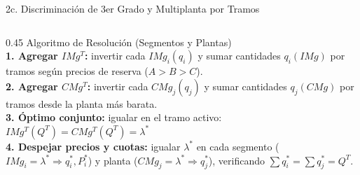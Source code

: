 \documentclass[aspectratio=169, 10pt]{beamer}
\begin{document}
\begin{frame}{2c. Discriminación de 3er Grado y Multiplanta por Tramos}
\begin{columns}[T]
    \begin{column}{0.45\textwidth}
      {\scriptsize\color{grisTexto}Algoritmo de Resolución (Segmentos y Plantas)}\\[2pt]
      {\scriptsize
        \textbf{1. Agregar \(IMg^T\):} invertir cada \(IMg_i(q_i)\) y sumar cantidades \(q_i(IMg)\) por tramos según precios de reserva (\(A > B > C\)).\\[2pt]
        \textbf{2. Agregar \(CMg^T\):} invertir cada \(CMg_j(q_j)\) y sumar cantidades \(q_j(CMg)\) por tramos desde la planta más barata.\\[2pt]
        \textbf{3. Óptimo conjunto:} igualar en el tramo activo:\\
        \quad \(\displaystyle IMg^T(Q^T) = CMg^T(Q^T) = \lambda^*\)\\[2pt]
        \textbf{4. Despejar precios y cuotas:} igualar \(\lambda^*\) en cada segmento (\(IMg_i = \lambda^* \Rightarrow q_i^*, P_i^*\)) y planta (\(CMg_j = \lambda^* \Rightarrow q_j^*\)), verificando \(\sum q_i^* = \sum q_j^* = Q^T\).\\[3pt]
      }
    \end{column}
  \end{columns}

\end{frame}
\end{document}
